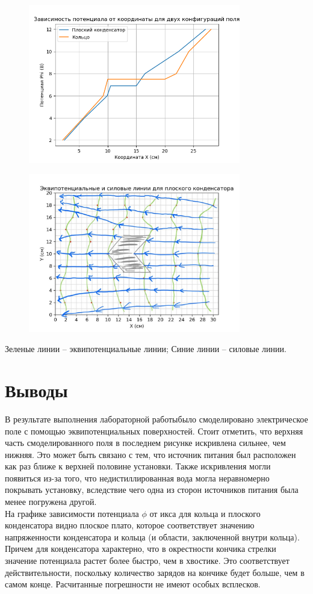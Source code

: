 \documentclass{article}%
\begin{document}
\begin{figure}[h!]%
\centering%
\includegraphics[width=350px]{2_potentials.png}%
\newpage%
\end{figure}

%


\begin{figure}[h!]%
\centering%
\includegraphics[width=350px]{potential_field.jpg}%
\end{figure}

%
Зеленые линии – эквипотенциальные линии; Синие линии – силовые линии.%
\newline%
\section{Выводы}%
\label{sec:}%

%
В результате выполнения лабораторной работыбыло смоделировано электрическое поле с помощью эквипотенциальных поверхностей. Стоит отметить, что верхняя часть смоделированного поля в последнем рисунке искривлена сильнее, чем нижняя. Это может быть связано с тем, что источник питания был расположен как раз ближе к верхней половине установки. Также искривления могли появиться из-за того, что недистиллированная вода могла неравномерно покрывать установку, вследствие чего одна из сторон источников питания была менее погружена другой. \\ На графике зависимости потенциала $\phi$ от икса для кольца и плоского конденсатора видно плоское плато, которое соответствует значению напряженности конденсатора и кольца (и области, заключенной внутри кольца). Причем для конденсатора характерно, что в окрестности кончика стрелки значение потенциала растет более быстро, чем в хвостике. Это соответствует действительности, поскольку количество зарядов на кончике будет больше, чем в самом конце. Расчитанные погрешности не имеют особых всплесков.%
\newline%
\end{document}
